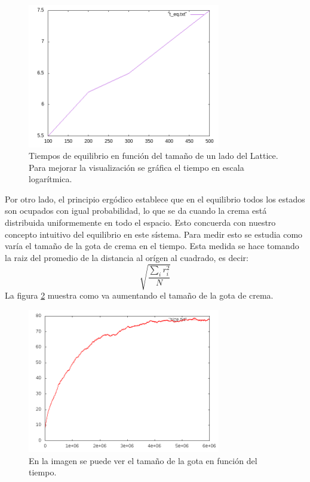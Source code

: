 \documentclass[12pt,twocolumn]{article}
\begin{document}
\begin{figure}
    \centering
    \includegraphics[width=0.75\textwidth]{figs/t_eq.png}
    \caption{Tiempos de equilibrio en función del tamaño de un lado del Lattice. Para mejorar la visualización se gráfica el tiempo en escala logarítmica.}
    \label{fig:t_de_eq}
\end{figure}

Por otro lado, el principio ergódico establece que en el equilibrio todos los estados son ocupados con igual probabilidad, lo que se da cuando la crema está distribuida uniformemente en todo el espacio. Esto concuerda con nuestro concepto intuitivo del equilibrio en este sístema. Para medir esto se estudia como varía el tamaño de la gota de crema en el tiempo. Esta medida se hace tomando la raiz del promedio de la distancia al orígen al cuadrado, es decir: 
\begin{equation*} \label{eq: root-mean}
	\sqrt{\frac{\sum_i r_i^2}{N}}
\end{equation*}
La figura \ref{fig:size_alone} muestra como va aumentando el tamaño de la gota de crema. 
\begin{figure}
    \centering
    \includegraphics[width=0.75\textwidth]{figs/size_alone.png}
    \caption{En la imagen se puede ver el tamaño de la gota en función del tiempo.}
    \label{fig:size_alone}
\end{figure}
\end{document}
